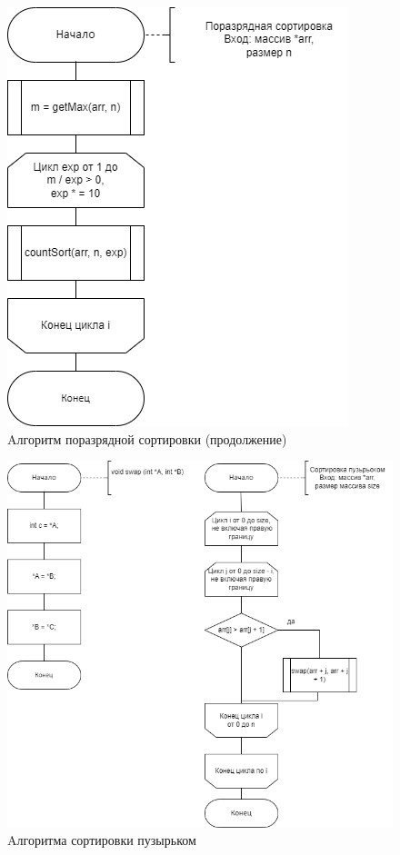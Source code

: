 \begin{figure}[h]
	\begin{center}
		\includegraphics[scale=0.7]{img/radix_sort_3.png}
	\end{center}
	\captionsetup{justification=centering}
	\caption{Aлгоритм поразрядной сортировки (продолжение)}
	\label{img:radix_sort_3}
\end{figure}
\clearpage
\begin{figure}[h]
	\begin{center}
		\includegraphics[scale=0.7]{img/bubble_sort.png}
	\end{center}
	\captionsetup{justification=centering}
	\caption{Aлгоритма сортировки пузырьком}
	\label{img:bubble_sort}
\end{figure}
\clearpage

